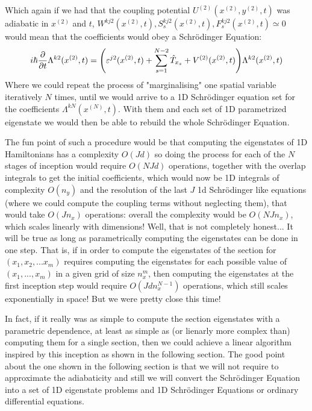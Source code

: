 \documentclass[11pt, a4paper]{article} %
\begin{document}
Which again if we had that the coupling potential $U^{(2)}(x^{(2)}, y^{(2)},t)$ was adiabatic in $x^{(2)}$ and $t$, $W^{kj2}(x^{(2)},t),S^{kj2}_s(x^{(2)},t),F^{kj2}_s(x^{(2)},t)\simeq 0$ would mean that the coefficients would obey a Schrödinger Equation:
\begin{equation}\label{incept2}
i\hbar \pdv{}{t}\Lambda^{k2}(x^{(2)},t)  = \qty( \varepsilon^{j2}(x^{(2)},t) + \sum_{s=1}^{N-2}\hat{T}_{x_s} +V^{(2)}(x^{(2)},t))\Lambda^{k2}(x^{(2)},t)
\end{equation}
Where we could repeat the process of "marginalising" one spatial variable iteratively $N$ times, until we would arrive to a 1D Schrödinger equation set for the coefficients $\Lambda^{kN}(x^{(N)},t)$. With them and each set of 1D parametrized eigenstate we would then be able to rebuild the whole Schrödinger Equation.

The fun point of such a procedure would be that computing the eigenstates of 1D Hamiltonians has a complexity $O(Jd)$ so doing the process for each of the $N$ stages of inception would require $O(NJd)$ operations, together with the overlap integrals to get the initial coefficients, which would now be 1D integrals of complexity $O(n_y)$ and the resolution of the last $J$ 1d Schrödinger like equations (where we could compute the coupling terms without neglecting them), that would take $O(Jn_x)$ operations: overall the complexity would be $O(NJn_x)$, which scales linearly with dimensions! Well, that is not completely honest... It will be true as long as parametrically computing the eigenstates can be done in one step. That is, if in order to compute the eigenstates of the section for $(x_1,x_2,...x_m)$ requires computing the eigenstates for each possible value of $(x_1,...,x_m)$ in a given grid of size $n_x^m$, then computing the eigenstates at the first inception step would require $O(Jdn_x^{N-1})$ operations, which still scales exponentially in space! But we were pretty close this time!

In fact, if it really was as simple to compute the section eigenstates with a parametric dependence, at least as simple as (or lienarly more complex than) computing them for a single section, then we could achieve a linear algorithm inspired by this inception as shown in the following section. The good point about the one shown in the following section is that we will not require to approximate the adiabaticity and still we will convert the Schrödinger Equation into a set of 1D eigenstate problems and 1D Schrödinger Equations or ordinary differential equations.
\end{document}
